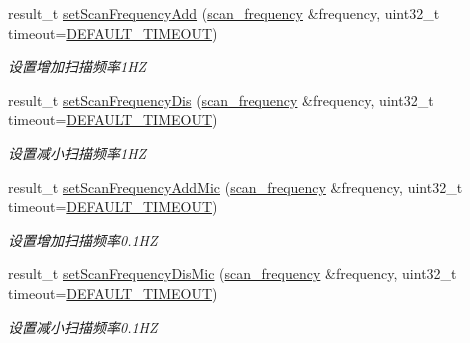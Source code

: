 \begin{DoxyCompactItemize}
\begin{DoxyCompactList}
\end{DoxyCompactList}\item 
result\+\_\+t \hyperlink{classydlidar_1_1_y_dlidar_driver_a0feea99573991bb4eb6f8e1718a71435}{set\+Scan\+Frequency\+Add} (\hyperlink{structscan__frequency}{scan\+\_\+frequency} \&frequency, uint32\+\_\+t timeout=\hyperlink{classydlidar_1_1_y_dlidar_driver_a13a4f2dc4067b43794b2c47c06d5d27aa07c79ce96f468ff4b40495ef84584442}{D\+E\+F\+A\+U\+L\+T\+\_\+\+T\+I\+M\+E\+O\+UT})
\begin{DoxyCompactList}\small\item\em 设置增加扫描频率1\+HZ ~\newline
\end{DoxyCompactList}\item 
result\+\_\+t \hyperlink{classydlidar_1_1_y_dlidar_driver_a811e3e1f0012925c8a90aebda9716738}{set\+Scan\+Frequency\+Dis} (\hyperlink{structscan__frequency}{scan\+\_\+frequency} \&frequency, uint32\+\_\+t timeout=\hyperlink{classydlidar_1_1_y_dlidar_driver_a13a4f2dc4067b43794b2c47c06d5d27aa07c79ce96f468ff4b40495ef84584442}{D\+E\+F\+A\+U\+L\+T\+\_\+\+T\+I\+M\+E\+O\+UT})
\begin{DoxyCompactList}\small\item\em 设置减小扫描频率1\+HZ ~\newline
\end{DoxyCompactList}\item 
result\+\_\+t \hyperlink{classydlidar_1_1_y_dlidar_driver_aa801f64f5ca2ce1e70ee096eb0b4b612}{set\+Scan\+Frequency\+Add\+Mic} (\hyperlink{structscan__frequency}{scan\+\_\+frequency} \&frequency, uint32\+\_\+t timeout=\hyperlink{classydlidar_1_1_y_dlidar_driver_a13a4f2dc4067b43794b2c47c06d5d27aa07c79ce96f468ff4b40495ef84584442}{D\+E\+F\+A\+U\+L\+T\+\_\+\+T\+I\+M\+E\+O\+UT})
\begin{DoxyCompactList}\small\item\em 设置增加扫描频率0.1\+HZ ~\newline
\end{DoxyCompactList}\item 
result\+\_\+t \hyperlink{classydlidar_1_1_y_dlidar_driver_a00e69cf360eeca890dbaf964ab6f67b7}{set\+Scan\+Frequency\+Dis\+Mic} (\hyperlink{structscan__frequency}{scan\+\_\+frequency} \&frequency, uint32\+\_\+t timeout=\hyperlink{classydlidar_1_1_y_dlidar_driver_a13a4f2dc4067b43794b2c47c06d5d27aa07c79ce96f468ff4b40495ef84584442}{D\+E\+F\+A\+U\+L\+T\+\_\+\+T\+I\+M\+E\+O\+UT})
\begin{DoxyCompactList}\small\item\em 设置减小扫描频率0.1\+HZ ~\newline

\end{DoxyCompactList}
\end{DoxyCompactItemize}
